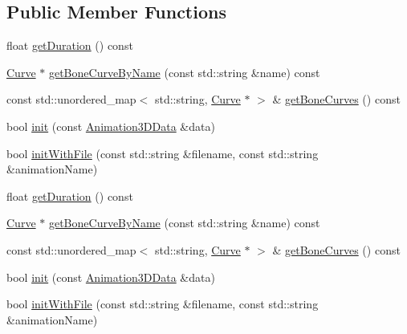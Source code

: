 \subsection*{Public Member Functions}
\begin{DoxyCompactItemize}
\item 
float \hyperlink{classAnimation3D_a02900b51836629f58ceb1546beb3d8ae}{get\+Duration} () const
\item 
\hyperlink{classAnimation3D_1_1Curve}{Curve} $\ast$ \hyperlink{classAnimation3D_a8fa5d064055406d8bccb521254ba505b}{get\+Bone\+Curve\+By\+Name} (const std\+::string \&name) const
\item 
const std\+::unordered\+\_\+map$<$ std\+::string, \hyperlink{classAnimation3D_1_1Curve}{Curve} $\ast$ $>$ \& \hyperlink{classAnimation3D_a6b0c090de8c980e8665ca708ce5bda0d}{get\+Bone\+Curves} () const
\item 
bool \hyperlink{classAnimation3D_af7c9c6855dd22f46b4e774f12b243f18}{init} (const \hyperlink{structAnimation3DData}{Animation3\+D\+Data} \&data)
\item 
bool \hyperlink{classAnimation3D_af422cbc2c0bf707c2f048299a7f6bd6d}{init\+With\+File} (const std\+::string \&filename, const std\+::string \&animation\+Name)
\item 
float \hyperlink{classAnimation3D_a02900b51836629f58ceb1546beb3d8ae}{get\+Duration} () const
\item 
\hyperlink{classAnimation3D_1_1Curve}{Curve} $\ast$ \hyperlink{classAnimation3D_a40f75128bcce9eb840460c3a7e343e4f}{get\+Bone\+Curve\+By\+Name} (const std\+::string \&name) const
\item 
const std\+::unordered\+\_\+map$<$ std\+::string, \hyperlink{classAnimation3D_1_1Curve}{Curve} $\ast$ $>$ \& \hyperlink{classAnimation3D_a6b0c090de8c980e8665ca708ce5bda0d}{get\+Bone\+Curves} () const
\item 
bool \hyperlink{classAnimation3D_af7c9c6855dd22f46b4e774f12b243f18}{init} (const \hyperlink{structAnimation3DData}{Animation3\+D\+Data} \&data)
\item 
bool \hyperlink{classAnimation3D_af422cbc2c0bf707c2f048299a7f6bd6d}{init\+With\+File} (const std\+::string \&filename, const std\+::string \&animation\+Name)
\end{DoxyCompactItemize}
